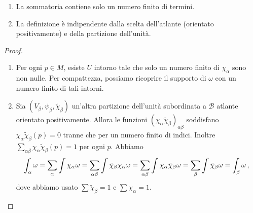 \begin{proposition}
	\begin{enumerate}
		\item La sommatoria contiene solo un numero finito di termini.
		\item La definizione è indipendente dalla scelta dell'atlante (orientato positivamente) e della partizione dell'unità.
	\end{enumerate}
\end{proposition}
\begin{proof}
	\begin{enumerate}
		\item Per ogni $p\in M$, esiste $U$ intorno tale che solo un numero finito di $\chi_\alpha$ sono non nulle. Per compattezza, possiamo ricoprire il supporto di $\omega$ con un numero finito di tali intorni.
		
		\item Sia $(V_\beta, \psi_\beta, \tilde \chi_\beta)$ un'altra partizione dell'unità subordinata a $\mathcal B$ atlante orientato positivamente. Allora le funzioni $(\chi_\alpha \tilde\chi_\beta)_{\alpha\beta}$ soddisfano $\chi_\alpha \tilde\chi_\beta(p) = 0$ tranne che per un numero finito di indici. Inoltre $\sum_{\alpha\beta} \chi_\alpha \tilde\chi_\beta(p) = 1$ per  ogni $p$.
		Abbiamo
		\begin{equation*}
			\int_\alpha \omega = \sum_\alpha \int \chi_\alpha \omega = \sum_{\alpha \beta} \int \tilde \chi_\beta \chi_\alpha \omega = \sum_{\alpha \beta} \int  \chi_\alpha \tilde \chi_\beta \omega = \sum_\beta \int \tilde\chi_\beta \omega = \int_\beta \omega \, \text{, }
		\end{equation*}
		dove abbiamo usato $\sum \tilde \chi_\beta = 1$ e $\sum \chi_\alpha = 1$.
	\end{enumerate}
\end{proof}

